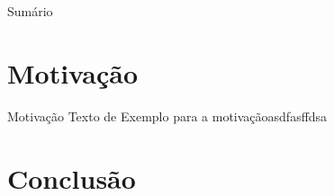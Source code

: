 \documentclass{libs/XJTLU_format}
\begin{document}
\begin{frame}{Sumário}
    \begin{multicols}{2}
        \tableofcontents
    \end{multicols}
\end{frame}

\section{Motivação}

\begin{frame}{Motivação}
    Texto de Exemplo para a motivaçãoasdfasffdsa
\end{frame}


\section{Conclusão}

\begin{frame}{}
    \centering
    \huge{\textbf{}}    
\end{frame}
\end{document}
